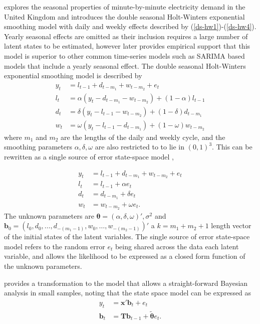 \documentclass[12pt,a4paper]{article}%
\numberwithin{equation}{section}
\begin{document}
\citet{Taylor2003} explores the seasonal properties of minute-by-minute electricity demand in the United Kingdom and introduces the double seasonal Holt-Winters exponential smoothing model with daily and weekly effects described by (\ref{ds-hw1})-(\ref{ds-hw4}). Yearly seasonal effects are omitted as their inclusion requires a large number of latent states to be estimated, however \citet{Taylor2008} later provides empirical support that this model is superior to other common time-series models such as SARIMA based models that include a yearly seasonal effect. The double seasonal Holt-Winters exponential smoothing model is described by
\begin{align}
y_t &= l_{t-1} + d_{t-m_1} + w_{t-m_2} + e_t \label{ds-hw1} \\
l_t &= \alpha (y_t - d_{t-m_1} - w_{t-m_2}) + (1 - \alpha)l_{t-1} \label{ds-hw2}\\
d_t &= \delta (y_t - l_{t-1} - w_{t-m_2}) + (1 - \delta)d_{t-m_1} \label{ds-hw3} \\
w_t &= \omega (y_t - l_{t-1} - d_{t-m_1}) + (1 - \omega)w_{t-m_2} \label{ds-hw4}
\end{align}
where $m_1$ and $m_2$ are the lengths of the daily and weekly cycle, and the smoothing parameters $\alpha, \delta, \omega$ are also restricted to to lie in $(0, 1)^3$. This can be rewritten as a single source of error state-space model \citep{Snyder1985},

\begin{align}
y_t &= l_{t-1} + d_{t-m_1} + w_{t-m_2} + e_t \label{ds-hw-ssoe1} \\
l_t &= l_{t-1} + \alpha e_t \label{ds-hw-ssoe2} \\
d_t &= d_{t-m_1} + \delta e_t \label{ds-hw-ssoe3} \\
w_t &= w_{t-m_2} + \omega e_t \label{ds-hw-ssoe4}. 
\end{align}
The unknown parameters are $\boldsymbol{\theta} = (\alpha, \delta, \omega)', \sigma^2$ and $\textbf{b}_0 = (l_0, d_0, \dots, d_{-(m_1 - 1)}, w_0, \dots, w_{-(m_2 - 1)})'$ a $k = m_1 + m_2 + 1$ length vector of the initial states of the latent variables. The single source of error state-space model refers to the random error $e_t$ being shared across the data each latent variable, and allows the likelihood to be expressed as a closed form function of the unknown parameters.

\citet{Forbes2000} provides a transformation to the model that allows a straight-forward Bayesian analysis in small samples, noting that the state space model can be expressed as
\begin{align}
y_t &= \textbf{x}' \textbf{b}_t + e_t \label{ss_me} \\
\textbf{b}_t &= \textbf{T} \textbf{b}_{t-1} + \tilde{\boldsymbol{\theta}} e_t \label{ss_te}.
\end{align}
\end{document}
